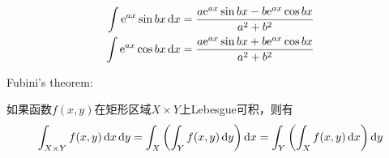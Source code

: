 \documentclass{../mathnotes-art}
\begin{document}
\begin{align*}
    \int \e^{ax} \sin bx \d{x} & =\frac{a\e^{ax} \sin bx -
    b\e^{ax}\cos bx}{a^{2}+b^{2}} \\
    \int \e^{ax} \cos bx \d{x} & =\frac{a\e^{ax} \sin bx +
    b\e^{ax}\cos bx}{a^{2}+b^{2}} \\
\end{align*}

Fubini's theorem:

如果函数\(f(x, y)\)在矩形区域\(X \times Y\)上Lebesgue可积，则有
\[
    \int_{X\times Y}  f(x, y) \d{x}\d{y} = \int_{X} \left(
    \int_{Y} f(x, y) \d{y} \right) \d{x} = \int_{Y} \left(
    \int_{X} f(x, y) \d{x} \right) \d{y}
\]

\end{document}
